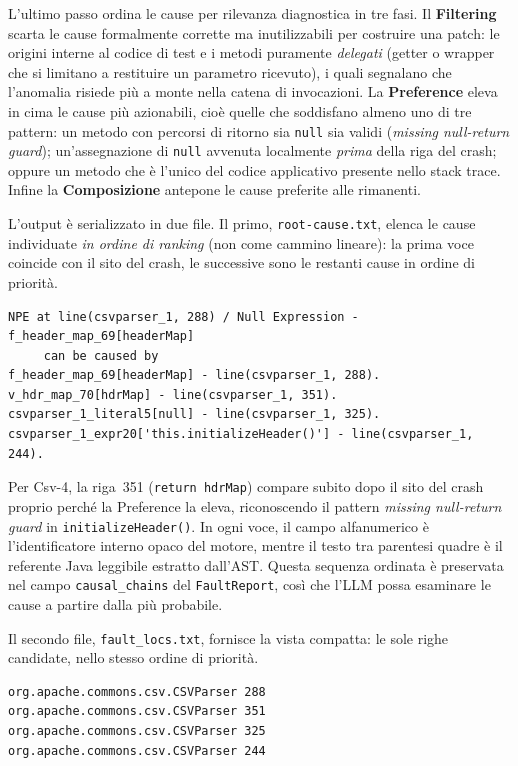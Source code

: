 L'ultimo passo ordina le cause per rilevanza diagnostica in tre fasi. Il \textbf{Filtering}
scarta le cause formalmente corrette ma inutilizzabili per costruire una patch: le origini interne al codice di
test e i metodi puramente \emph{delegati} (getter o wrapper che si limitano a restituire un parametro ricevuto),
i quali segnalano che l'anomalia risiede più a monte nella catena di invocazioni. La \textbf{Preference} eleva
in cima le cause più azionabili, cioè quelle che soddisfano almeno uno di tre pattern: un metodo con percorsi di
ritorno sia \texttt{null} sia validi (\emph{missing null-return guard}); un'assegnazione di \texttt{null}
avvenuta localmente \emph{prima} della riga del crash; oppure un metodo che è l'unico del codice applicativo
presente nello stack trace. Infine la \textbf{Composizione} antepone le cause preferite alle rimanenti.

L'output è serializzato in due file. Il primo, \texttt{root-cause.txt}, elenca le cause individuate \emph{in
ordine di ranking} (non come cammino lineare): la prima voce coincide con il sito del crash, le successive sono
le restanti cause in ordine di priorità.
\begin{lstlisting}
NPE at line(csvparser_1, 288) / Null Expression - f_header_map_69[headerMap]
	 can be caused by
f_header_map_69[headerMap] - line(csvparser_1, 288).
v_hdr_map_70[hdrMap] - line(csvparser_1, 351).
csvparser_1_literal5[null] - line(csvparser_1, 325).
csvparser_1_expr20['this.initializeHeader()'] - line(csvparser_1, 244).
\end{lstlisting}

Per Csv-4, la riga~351 (\texttt{return hdrMap}) compare subito dopo il sito del crash proprio perché la
Preference la eleva, riconoscendo il pattern \emph{missing null-return guard} in \texttt{initializeHeader()}. In
ogni voce, il campo alfanumerico è l'identificatore interno opaco del motore, mentre il testo tra parentesi
quadre è il referente Java leggibile estratto dall'AST. Questa sequenza ordinata è preservata nel campo
\texttt{causal\_chains} del \texttt{FaultReport}, così che l'LLM possa esaminare le cause a partire dalla più
probabile.

Il secondo file, \texttt{fault\_locs.txt}, fornisce la vista compatta: le sole righe candidate, nello stesso
ordine di priorità.

\begin{lstlisting}
org.apache.commons.csv.CSVParser 288
org.apache.commons.csv.CSVParser 351
org.apache.commons.csv.CSVParser 325
org.apache.commons.csv.CSVParser 244
\end{lstlisting}


